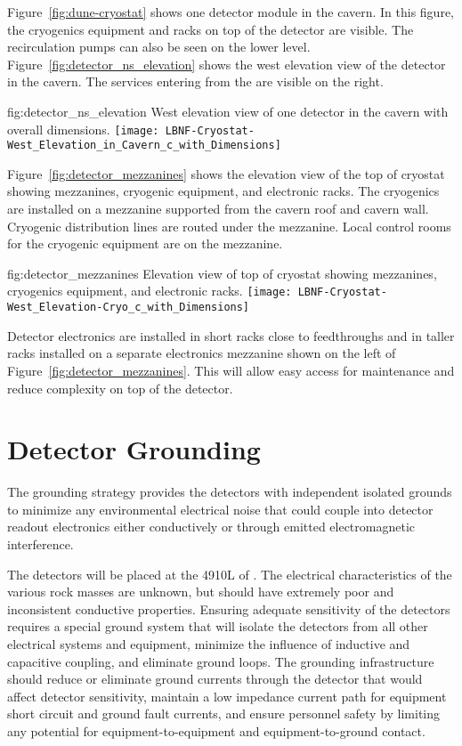 Figure~\ref{fig:dune-cryostat} shows one detector module in the
cavern. In this figure, the cryogenics equipment and racks on top of
the detector are visible. The  recirculation pumps can also be seen
on the lower level.
Figure~\ref{fig:detector_ns_elevation} shows the west
elevation view of the detector in the cavern. The services entering
from the  are visible on the right.
\begin{dunefigure}{fig:detector_ns_elevation}
  {West elevation view of one detector in the cavern with overall dimensions.}
  \texttt{[image: LBNF-Cryostat-West\_Elevation\_in\_Cavern\_c\_with\_Dimensions]}
\end{dunefigure}
Figure~\ref{fig:detector_mezzanines} shows the elevation view of the
top of cryostat showing mezzanines, cryogenic equipment, and
electronic racks.
The cryogenics are installed on a mezzanine supported from
the cavern roof and cavern wall. Cryogenic distribution lines are
routed under the mezzanine. Local control rooms for the
cryogenic equipment are on the mezzanine.
\begin{dunefigure}{fig:detector_mezzanines}
  {Elevation view of top of cryostat showing mezzanines, cryogenics
    equipment, and electronic racks.}
  \texttt{[image: LBNF-Cryostat-West\_Elevation-Cryo\_c\_with\_Dimensions]}
\end{dunefigure}

Detector electronics are installed in short racks close to
feedthroughs and in taller racks installed on a separate electronics
mezzanine shown on the left of Figure~\ref{fig:detector_mezzanines}.
This will allow easy access for maintenance and reduce complexity on
top of the detector.

\section{Detector Grounding}
\label{sec:fdsp-coord-faci-grounding}


The grounding strategy provides the detectors with independent
isolated grounds to minimize any environmental electrical noise that
could couple into detector readout electronics either conductively or
through emitted electromagnetic interference.

The detectors will be placed at the 4910L of \surf. The
electrical characteristics of the various rock masses are unknown, but
should have extremely poor and inconsistent conductive
properties. Ensuring adequate sensitivity of the detectors requires a
special ground system that will isolate the detectors from all other
electrical systems and equipment, minimize the influence of inductive
and capacitive coupling, and eliminate ground loops. The grounding
infrastructure should reduce or eliminate ground currents through the
detector that would affect detector sensitivity, maintain a low
impedance current path for equipment short circuit and ground fault
currents, and ensure personnel safety by limiting any potential for
equipment-to-equipment and equipment-to-ground contact.

